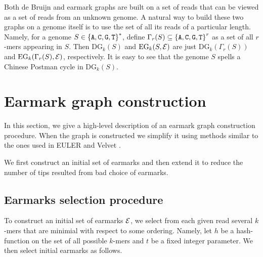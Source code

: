 \documentclass[12pt]{article}
\def\acgt{\{{\tt A,C,G,T}\}}
\begin{document}
Both de Bruijn and earmark graphs are built on a set of reads that can be viewed as a 
set of reads from an unknown genome. A natural way to build these two graphs on a genome
itself is to use the set of all its reads of a particular length. Namely, 
for a genome $S \in {\acgt}^*$, define $\Gamma_r(S) \subseteq {\acgt}^r$
as a set of all $r$-mers appearing in $S$. Then $\textrm{DG}_k(S)$ 
and $\textrm{EG}_k(S, {\cal E})$
are just $\textrm{DG}_k(\Gamma_r(S))$ and $\textrm{EG}_k(\Gamma_r(S), {\cal E})$, respectively.
It is easy to see that the genome $S$ spells a Chinese Postman cycle in 
$\textrm{DG}_k(S)$.

\section{Earmark graph construction}
In this section, we give a high-level description of an earmark graph construction procedure.
When the graph is constructed we simplify it using methods similar to the ones used in
EULER \cite{PW01} and Velvet \cite{Z08}.

We first construct an initial set of earmarks and then extend it to reduce 
the number of tips
resulted from bad choice of earmarks.

\subsection{Earmarks selection procedure}
To construct an initial set of earmarks ${\cal E}$, we select from each given read 
several $k$-mers that are minimial with respect to some ordering. Namely, 
let $h$ be a hash-function on the set of all possible $k$-mers and $t$ be a 
fixed integer parameter.
We then select initial earmarks as follows.


\end{document}
